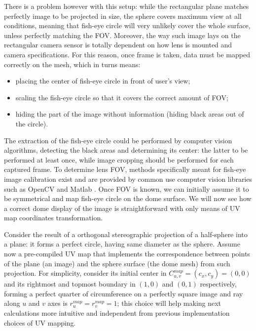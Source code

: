There is a problem however with this setup: while the rectangular plane matches perfectly image to be projected in size, the sphere covers maximum view at all conditions, meaning that fish-eye circle will very unlikely cover the whole surface, unless perfectly matching the FOV. Moreover, the way such image lays on the rectangular camera sensor is totally dependent on how lens is mounted and camera specifications. For this reason, once frame is taken, data must be mapped correctly on the mesh, which in turns means:
\begin{itemize}
\item placing the center of fish-eye circle in front of user's view;
\item scaling the fish-eye circle so that it covers the correct amount of FOV;
\item hiding the part of the image without information (hiding black areas out of the circle).
\end{itemize}
The extraction of the fish-eye circle could be performed by computer vision algorithms, detecting the black areas and determining its center: the latter to be performed at least once, while image cropping should be performed for each captured frame. To determine lens FOV, methods specifically meant for fish-eye image calibration exist and are provided by common use computer vision libraries such as OpenCV \cite{link_calib3d_opencv} and Matlab \cite{link_matlab_ocamcalib}. Once FOV is known, we can initially assume it to be symmetrical and map fish-eye circle on the dome surface. We will now see how a correct dome display of the image is straightforward with only means of UV map coordinates transformation.

Consider the result of a orthogonal stereographic projection of a half-sphere into a plane: it forms a perfect circle, having same diameter as the sphere. Assume now a pre-compiled UV map that implements the correspondence between points of the plane (an image) and the sphere surface (the dome mesh) from such projection. For simplicity, consider its initial center in $C^{map}_{u,v}=(c_x,c_y)=(0,0)$ and its rightmost and topmost boundary in $(1,0)$ and $(0,1)$ respectively, forming a perfect quarter of circumference on a perfectly square image and ray along $u$ and $v$ axes is $r^{map}_{u}=r^{map}_{v}=1$; this choice will help making next calculations more intuitive and independent from previous implementation choices of UV mapping.

